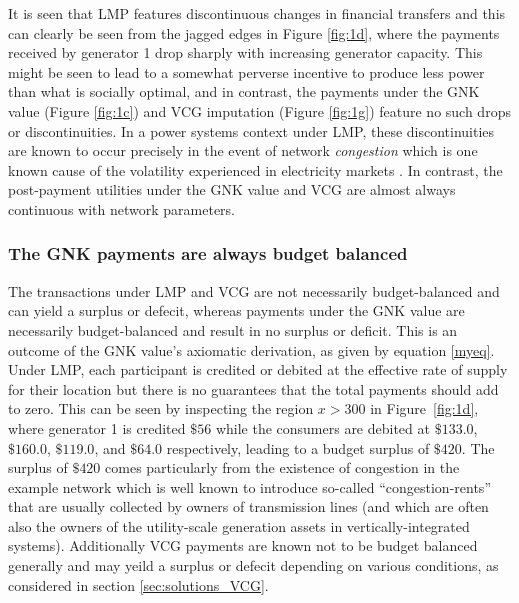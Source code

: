 It is seen that LMP features discontinuous changes in financial transfers and this can clearly be seen from the jagged edges in Figure \ref{fig:1d}, where the payments received by generator 1 drop sharply with increasing generator capacity.
This might be seen to lead to a somewhat perverse incentive to produce less power than what is socially optimal, and in contrast, the payments under the GNK value (Figure \ref{fig:1c}) and VCG imputation (Figure \ref{fig:1g}) feature no such drops or discontinuities.
In a power systems context under LMP, these discontinuities are known to occur precisely in the event of network \emph{congestion}
which is one known cause of the volatility experienced in electricity markets \cite{RePEc:aen:journl:2006v27-02-a09}. 
In contrast, the post-payment utilities under the GNK value and VCG are almost always continuous with network parameters.



\subsubsection*{The GNK payments are always budget balanced}
The transactions under LMP and VCG are not necessarily budget-balanced and can yield a surplus or defecit, whereas payments under the GNK value are necessarily budget-balanced and result in no surplus or deficit.
This is an outcome of the GNK value's axiomatic derivation, as given by equation \eqref{myeq}.
Under LMP, each participant is credited or debited at the effective rate of supply for their location but there is no guarantees that the total payments should add to zero.
This can be seen by inspecting the region $x>300$ in Figure~\ref{fig:1d}, where generator 1 is credited $\$56$ while the consumers are debited at $\$133.0$, $\$160.0$, $\$119.0$, and $\$64.0$ respectively, leading to a budget surplus of $\$420$.
The surplus of $\$420$ comes particularly from the existence of congestion in the example network which is well known to introduce so-called ``congestion-rents'' that are usually collected by owners of transmission lines \cite{lmp2} (and which are often also the owners of the utility-scale generation assets in vertically-integrated systems).
Additionally VCG payments are known not to be budget balanced generally and may yeild a surplus or defecit depending on various conditions, as considered in section \ref{sec:solutions_VCG}.

